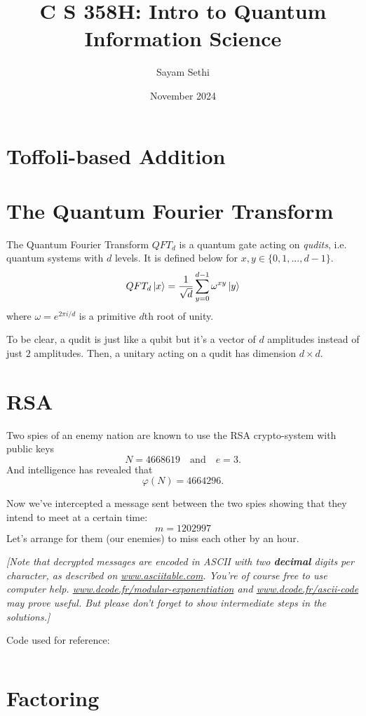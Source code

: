 \documentclass[11pt]{article}
\title{C S 358H: Intro to Quantum Information Science}
\author{Sayam Sethi}
\date{November 2024}
\begin{document}
\maketitle

\tableofcontents


\newpage

\section{Toffoli-based Addition}


\newpage

\section{The Quantum Fourier Transform}
The Quantum Fourier Transform $QFT_d$ is a quantum gate acting on \textit{qudits}, i.e. quantum systems with $d$ levels. It is defined below for $x,y \in \{0,1,..., d-1\}$.
$$QFT_d\ket{x} = \frac{1}{\sqrt{d}} \sum^{d-1}_{y=0} \omega^{xy} \ket{y} $$
where $\omega = e^{2 \pi i /d}$ is a primitive $d$th root of unity.

To be clear, a qudit is just like a qubit but it's a vector of $d$ amplitudes instead of just $2$ amplitudes. Then, a unitary acting on a qudit has dimension $d\times d$.


\newpage

\section{RSA}
Two spies of an enemy nation are known to use the RSA crypto-system with public keys
\[
N = 4668619 \quad\text{and}\quad e = 3.
\]
And intelligence has revealed that
\[
\varphi(N) = 4664296.
\]

Now we've intercepted a message sent between the two spies showing that they intend to meet at a certain time:
\[
m = 1202997
\]
Let's arrange for them (our enemies) to miss each other by an hour.

\textit{[Note that decrypted messages are encoded in ASCII with two \textbf{decimal} digits per character, as described on \url{www.asciitable.com}. You're of course free to use computer help. \url{www.dcode.fr/modular-exponentiation} and \url{www.dcode.fr/ascii-code} may prove useful. But please don't forget to show intermediate steps in the solutions.]}

Code used for reference:
\inputminted{python}{rsa.py}

\newpage

\section{Factoring}

\end{document}
